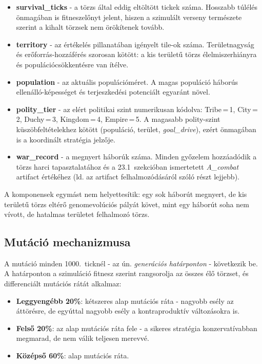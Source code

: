 \begin{itemize}
  \item \textbf{survival\_ticks} - a törzs által eddig eltöltött tickek száma.
    Hosszabb túlélés önmagában is fitneszelőnyt jelent, hiszen a szimulált verseny
    természete szerint a kihalt törzsek nem örökítenek tovább.
  \item \textbf{territory} - az értékelés pillanatában igényelt tile-ok száma.
    Területnagyság és erőforrás-hozzáférés szorosan kötött: a kis területű törzs
    élelmiszerhiányra és populációcsökkentésre van ítélve.
  \item \textbf{population} - az aktuális populációméret. A magas populáció
    háborús ellenálló-képességet és terjeszkedési potenciált egyaránt növel.
  \item \textbf{polity\_tier} - az elért politikai szint numerikusan kódolva:
    Tribe\,=\,1, City\,=\,2, Duchy\,=\,3, Kingdom\,=\,4, Empire\,=\,5.
    A magasabb polity-szint küszöbfeltételekhez kötött (populáció, terület,
    \textit{goal\_drive}), ezért önmagában is a koordinált stratégia jelzője.
  \item \textbf{war\_record} - a megnyert háborúk száma. Minden győzelem
    hozzáadódik a törzs harci tapasztalatához és a 23.1~szekcióban ismertetett
    \textit{A\_combat} artifact értékéhez (ld. az artifact felhalmozódásáról szóló
    részt lejjebb).
\end{itemize}

A komponensek egymást nem helyettesítik: egy sok háborút megnyert, de kis területű
törzs eltérő genomevolúciós pályát követ, mint egy háborút soha nem vívott,
de hatalmas területet felhalmozó törzs.

\subsection*{Mutáció mechanizmusa}

A mutáció minden 1000.~ticknél - az ún. \textit{generációs határponton} - következik be.
A határponton a szimuláció fitnesz szerint rangsorolja az összes élő törzset,
és differenciált mutációs rátát alkalmaz:

\begin{itemize}
  \item \textbf{Leggyengébb 20\%}: kétszeres alap mutációs ráta - nagyobb esély
    az áttörésre, de egyúttal nagyobb esély a kontraproduktív változásokra is.
  \item \textbf{Felső 20\%}: az alap mutációs ráta fele - a sikeres stratégia
    konzervatívabban megmarad, de nem válik teljesen merevvé.
  \item \textbf{Középső 60\%}: alap mutációs ráta.
\end{itemize}

